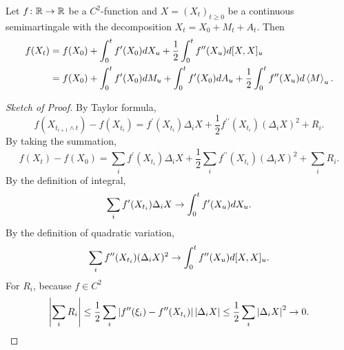 \begin{thm}
    Let $f \colon \mathbb{R} \rightarrow \mathbb{R}$ be a $C^2$-function and $X=(X_t)_{t \geq 0}$ be a continuous semimartingale with the decomposition $X_t = X_0 + M_t + A_t$. Then
    \begin{align*}
        f(X_t) &= f(X_0) + \int_0^t f^\prime(X_0)dX_u + \frac{1}{2} \int_0^t f^{\prime\prime}(X_u)d[X,X]_u\\
        &= f(X_0) + \int_0^t f^\prime(X_0) dM_u + \int_0^t f^\prime(X_0) dA_u + \frac{1}{2}\int_0^t f^{\prime\prime}(X_u)d\left\langle M \right\rangle_u.
    \end{align*}
\end{thm}
\begin{proof}[Sketch of Proof]
    By Taylor formula,
    \begin{equation*}
        f(X_{t_{i+1} \wedge t}) -f(X_{t_i}) = f^\prime(X_{t_i}) \Delta_i X + \frac{1}{2} f^{\prime \prime}(X_{t_i})(\Delta_i X)^2 + R_i.
    \end{equation*}
    By taking the summation,
    \begin{equation*}
        f(X_t) - f(X_0) = \sum_i f^\prime(X_{t_i}) \Delta_i X + \frac{1}{2} \sum_i f^{\prime \prime}(X_{t_i})(\Delta_i X)^2 + \sum_i R_i.
    \end{equation*}
    By the definition of integral,
    \begin{equation*}
        \sum_i f^\prime(X_{t_i}) \Delta_i X  \rightarrow \int_0^t f^\prime(X_u)dX_u.
    \end{equation*}
    By the definition  of quadratic variation,
    \begin{equation*}
         \sum_i f^{\prime \prime}(X_{t_i})(\Delta_i X)^2 \rightarrow \int_0^t f^{\prime \prime}(X_u)d[X,X]_u.
    \end{equation*}
    For $R_i$, because $f \in C^2$
    \begin{equation*}
        \left\lvert\sum_i R_i\right\lvert \leq \frac{1}{2}\sum_i \left\lvert f^{\prime \prime}(\xi_i) - f^{\prime \prime}(X_{t_i})\right\lvert\left\lvert\Delta_iX\right\lvert \leq \frac{1}{2}\sum_i \left\lvert\Delta_iX\right\lvert^2 \rightarrow 0. \qedhere
    \end{equation*}
\end{proof}
